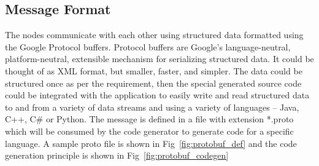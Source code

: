 \subsection{Message Format}
	The nodes communicate with each other using structured data formatted using the Google Protocol buffers\cite{ProtocolBuffers}. Protocol buffers are Google's language-neutral, platform-neutral, extensible mechanism for serializing structured data. It could be thought of as XML format, but smaller, faster, and simpler. The data could be structured once as per the requirement, then the special generated source code could be integrated with the application to easily write and read structured data to and from a variety of data streams and using a variety of languages – Java, C++, C\# or Python. The message is defined in a file with extension *.proto which will be consumed by the code generator to generate code for a specific language. A sample proto file is shown in Fig~\ref{fig:protobuf_def} and the code generation principle is shown in Fig~\ref{fig:protobuf_codegen}
